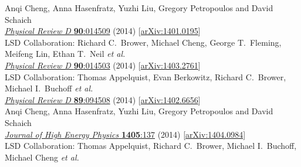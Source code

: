 \begin{spacelist}
\begin{revnumerate}
      Anqi Cheng, Anna Hasenfratz, Yuzhi Liu, Gregory Petropoulos and David Schaich \\
      \href{http://dx.doi.org/10.1103/PhysRevD.90.014509}{\textit{Physical Review D} \textbf{90}:014509} (2014) [\href{http://arxiv.org/abs/1401.0195}{arXiv:1401.0195}]
    \pagebreakitem
       \\
      LSD Collaboration: Richard C.~Brower, Michael Cheng, George T.~Fleming, Meifeng Lin, Ethan T.~Neil \textit{et al.} \\ %
      \href{http://dx.doi.org/10.1103/PhysRevD.90.014503}{\textit{Physical Review D} \textbf{90}:014503} (2014) [\href{http://arxiv.org/abs/1403.2761}{arXiv:1403.2761}]%
    \pagebreakitem
       \\
      LSD Collaboration: Thomas Appelquist, Evan Berkowitz, Richard C.~Brower, Michael I.~Buchoff \textit{et al.} \\ %
      \href{http://dx.doi.org/10.1103/PhysRevD.89.094508}{\textit{Physical Review D} \textbf{89}:094508} (2014) [\href{http://arxiv.org/abs/1402.6656}{arXiv:1402.6656}]
    \pagebreakitem
       \\
      Anqi Cheng, Anna Hasenfratz, Yuzhi Liu, Gregory Petropoulos and David Schaich \\
      \href{http://dx.doi.org/10.1007/JHEP05(2014)137}{\textit{Journal of High Energy Physics} \textbf{1405}:137} (2014) [\href{http://arxiv.org/abs/1404.0984}{arXiv:1404.0984}]
    \pagebreakitem
       \\
      LSD Collaboration: Thomas Appelquist, Richard C.~Brower, Michael I.~Buchoff, Michael Cheng \textit{et al.} \\ %

\end{revnumerate}
\end{spacelist}
